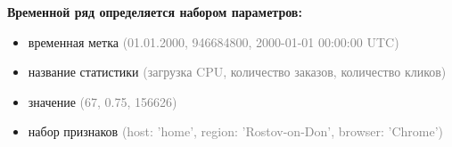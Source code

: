 \begin{frame}
  \bfseries Временной ряд определяется набором параметров:
  \normalfont
  \vspace{2em}
  \begin{itemize}[leftmargin=1em,itemsep=0.7em, label=\RNDSmarker]
    \item временная метка \textcolor{gray}{(01.01.2000, 946684800, 2000-01-01 00:00:00 UTC)}
    \item название статистики \textcolor{gray}{(загрузка CPU, количество заказов, количество кликов)}
    \item значение \textcolor{gray}{(67, 0.75, 156626)}
    \item набор признаков \textcolor{gray}{(host: 'home', region: 'Rostov-on-Don', browser: 'Chrome')}
  \end{itemize}
\end{frame}
